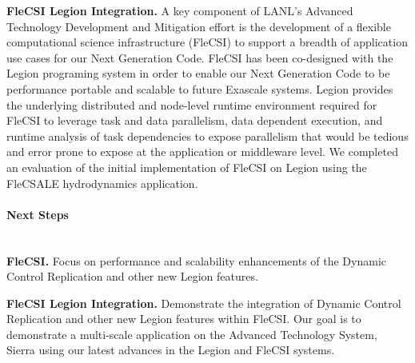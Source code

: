 \textbf{FleCSI Legion Integration.} A key component of LANL's Advanced Technology  Development and Mitigation effort is the development of a flexible computational science infrastructure (FleCSI) to support a breadth of application use cases for our Next Generation Code. FleCSI has been co-designed with the Legion programing system in order to enable our Next Generation Code to be performance portable and scalable to future Exascale systems. Legion provides the underlying distributed and node-level runtime environment required for FleCSI to leverage task and data parallelism, data dependent execution, and runtime analysis of task dependencies to expose parallelism that would be tedious and error prone to expose at the application or middleware level. We completed an evaluation of the initial implementation of FleCSI on Legion using the FleCSALE hydrodynamics application. 



\paragraph{Next Steps}  \leavevmode \\


\textbf{FleCSI.} Focus on performance and scalability enhancements of the Dynamic Control Replication and other new Legion features. 

\textbf{FleCSI Legion Integration.} Demonstrate the integration of Dynamic Control Replication and other new Legion features within FleCSI. Our goal is to demonstrate a multi-scale application on the Advanced Technology System, Sierra using our latest advances in the Legion and FleCSI systems. 

